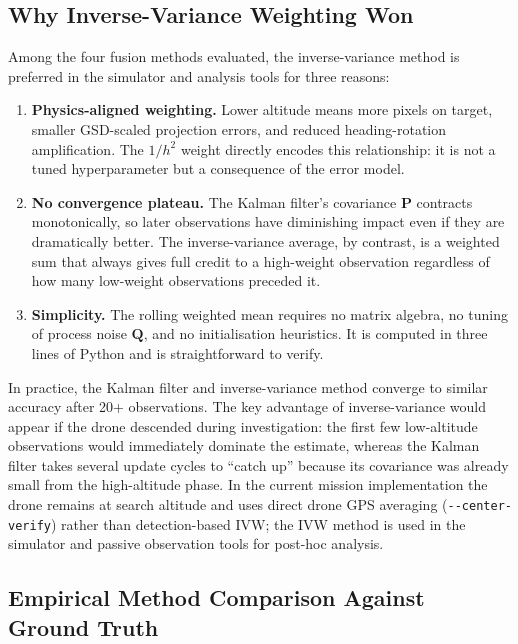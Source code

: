\subsection{Why Inverse-Variance Weighting Won}\label{sec:why-ivw}

Among the four fusion methods evaluated, the inverse-variance method is preferred in the simulator and analysis tools for three reasons:

\begin{enumerate}
  \item \textbf{Physics-aligned weighting.}  Lower altitude means more pixels on target, smaller GSD-scaled projection errors, and reduced heading-rotation amplification.  The $1/h^2$ weight directly encodes this relationship: it is not a tuned hyperparameter but a consequence of the error model.
  \item \textbf{No convergence plateau.}  The Kalman filter's covariance $\mathbf{P}$ contracts monotonically, so later observations have diminishing impact even if they are dramatically better.  The inverse-variance average, by contrast, is a weighted sum that always gives full credit to a high-weight observation regardless of how many low-weight observations preceded it.
  \item \textbf{Simplicity.}  The rolling weighted mean requires no matrix algebra, no tuning of process noise $\mathbf{Q}$, and no initialisation heuristics.  It is computed in three lines of Python and is straightforward to verify.
\end{enumerate}

\noindent In practice, the Kalman filter and inverse-variance method converge to similar accuracy after 20+ observations.  The key advantage of inverse-variance would appear if the drone descended during investigation: the first few low-altitude observations would immediately dominate the estimate, whereas the Kalman filter takes several update cycles to ``catch up'' because its covariance was already small from the high-altitude phase.  In the current mission implementation the drone remains at search altitude and uses direct drone GPS averaging (\texttt{-{}-center-verify}) rather than detection-based IVW; the IVW method is used in the simulator and passive observation tools for post-hoc analysis.


\subsection{Empirical Method Comparison Against Ground Truth}\label{sec:empirical-comparison}

